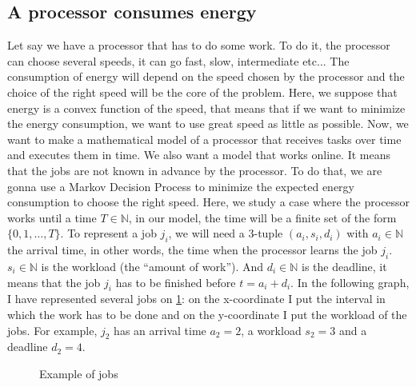 \documentclass[
10pt, %
a4paper, %
oneside, %
headinclude,footinclude, %
BCOR5mm, %
]{scrartcl}
\newcommand{\N}{\mathbb{N}}
\begin{document}
\subsection{A processor consumes energy}
Let say we have a processor that has to do some work. To do it,
the processor can choose several speeds, it can go fast, slow,
intermediate etc... The consumption of energy will depend on the speed
chosen by the processor and the choice of the right speed will be the
core of the problem.
Here, we suppose that energy is a convex function of
the speed, that means that if we want to minimize the energy
consumption, we want to use great speed as little as possible. Now, we
want to make a mathematical model of a processor that receives tasks
over time and executes them in time. We also want a model that works
online. It means that the jobs are not known in advance by the
processor. To do that, we are gonna use a Markov Decision Process to
minimize the expected energy consumption to choose the right
speed. Here, we study a case where the processor works until a time
$T\in\N$, in our model, the time will be a finite set of the form
$\{0,1,\dots,T\}$. To represent a job $j_i$, we will need a 3-tuple
$(a_i,s_i,d_i)$ with $a_i\in\N$ the arrival time, in other words, the
time when the processor learns the job $j_i$. $s_i\in\N$ is the
workload (the ``amount of work''). And $d_i\in\N$ is the deadline, it
means that the job $j_i$ has to be finished before $t=a_i+d_i$. In the
following graph, I have represented several jobs on \ref{fig:jobs}: on the x-coordinate
I put the interval in which the work has to be done and on the
y-coordinate I put the workload of the jobs. For example, $j_2$ has an
arrival time $a_2=2$, a workload $s_2=3$ and a deadline $d_2=4$. 

\begin{figure}
  \centering
  \caption{Example of jobs}
  \label{fig:jobs}  
\end{figure}
\end{document}
